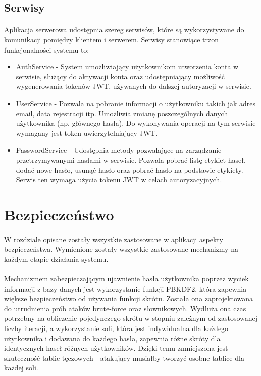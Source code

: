 \documentclass{article}
\begin{document}
    \subsection{Serwisy}
    \paragraph{} Aplikacja serwerowa udostępnia szereg serwisów, które są wykorzystywane do komunikacji pomiędzy klientem i serwerem. Serwisy stanowiące trzon funkcjonalności systemu to:
    \begin{itemize}
        \item AuthService - System umożliwiający użytkownikom utworzenia konta w serwisie, służący do aktywacji konta oraz udostępniający możliwość wygenerowania tokenów JWT, używanych do dalszej autoryzacji w serwisie.
        \item UserService - Pozwala na pobranie informacji o użytkowniku takich jak adres email, data rejestracji itp. Umożliwia zmianę poszczególnych danych użytkownika (np. głównego hasła). Do wykonywania operacji na tym serwisie wymagany jest token uwierzytelniający JWT.
        \item PasswordService - Udostępnia metody pozwalające na zarządzanie przetrzymywanymi hasłami w serwisie. Pozwala pobrać listę etykiet haseł, dodać nowe hasło, usunąć hasło oraz pobrać hasło na podstawie etykiety. Serwis ten wymaga użycia tokenu JWT w celach autoryzacyjnych.
    \end{itemize}

    \section{Bezpieczeństwo}
    \paragraph{}W rozdziale opisane zostały wszystkie zastosowane w aplikacji aspekty bezpieczeństwa. Wymienione zostały wszystkie zastosowane mechanizmy na każdym etapie działania systemu.

    \paragraph{}Mechanizmem zabezpieczającym ujawnienie hasła użytkownika poprzez wyciek informacji z bazy danych jest wykorzystanie funkcji  PBKDF2, która zapewnia większe bezpieczeństwo od używania funkcji skrótu. Została ona zaprojektowana do utrudnienia prób ataków brute-force oraz słownikowych. Wydłuża ona czas potrzebny na obliczenie pojedynczego skrótu w stopniu zależnym od zastosowanej liczby iteracji, a wykorzystanie soli, która jest indywidualna dla każdego użytkownika i dodawana do każdego hasła, zapewnia różne skróty dla identycznych haseł różnych użytkowników. Dzięki temu zmniejszona jest skuteczność tablic tęczowych - atakujący musiałby tworzyć osobne tablice dla każdej soli.
\end{document}
